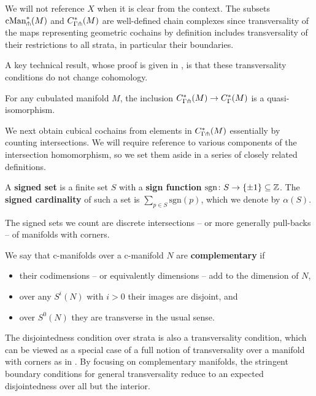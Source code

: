 We will not reference $X$ when it is clear from the context.
The subsets $\mathrm{cMan}_\pitchfork^*(M)$ and $C^*_{\Gamma \pitchfork}(M)$ are well-defined chain complexes since transversality of the maps representing geometric cochains by definition includes transversality of their restrictions to all strata, in particular their boundaries.

A key technical result, whose proof is given in \cite{medina2022foundations}, is that these transversality conditions do not change cohomology.

\begin{theorem}\label{T:transverse complex}
	For any cubulated manifold $M$, the inclusion $C^*_{\Gamma \pitchfork}(M) \to C^*_\Gamma(M)$ is a quasi-isomorphism.
\end{theorem}

We next obtain cubical cochains from elements in $C^*_{\Gamma \pitchfork}(M)$ essentially by counting intersections.
We will require reference to various components of the intersection homomorphism, so we set them aside in a series of closely related definitions.

\begin{definition}
	A \textbf{signed set} is a finite set $S$ with a \textbf{sign function} $\mathrm{sgn} \colon S \to \{\pm 1\} \subseteq \mathbb{Z}$.
	The \textbf{signed cardinality} of such a set is $\sum_{p \in S} \mathrm{sgn}(p)$, which we denote by $\alpha(S)$.
\end{definition}

The signed sets we count are discrete intersections -- or more generally pull-backs -- of manifolds with corners.

\begin{definition}
	We say that c-manifolds over a c-manifold $N$ are \textbf{complementary} if
	\begin{itemize}
		\item their codimensions -- or equivalently dimensions -- add to the dimension of $N$,
		\item over any $S^i(N)$ with $i>0$ their images are disjoint, and
		\item over $S^0(N)$ they are transverse in the usual sense.
	\end{itemize}
\end{definition}

The disjointedness condition over strata is also a transversality condition, which can be viewed as a special case of a full notion of transversality over a manifold with corners as in \cite{Joy12}.
By focusing on complementary manifolds, the stringent boundary conditions for general transversality reduce to an expected disjointedness over all but the interior.

